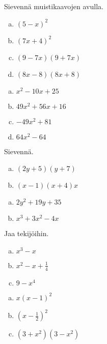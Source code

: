 \begin{tehtava}
    Sievennä muistikaavojen avulla.
    \begin{enumerate}[a)]
        \item $(5-x)^2$
        \item $(7x + 4)^2$
        \item $(9 - 7x)(9 + 7x)$
        \item $(8x - 8)(8x + 8)$
    \end{enumerate}
    \begin{vastaus}
        \begin{enumerate}[a)]
            \item $x^2 - 10x + 25$
            \item $49x^2 + 56x + 16$
            \item $-49x^2 + 81$
            \item $64x^2 - 64$
        \end{enumerate}
    \end{vastaus}
\end{tehtava}

\begin{tehtava}
    Sievennä.
    \begin{enumerate}[a)]
        \item $(2y+5)(y+7)$
        \item $(x-1)(x+4)x$
    \end{enumerate}
    \begin{vastaus}
        \begin{enumerate}[a)]
            \item $2y^2 + 19y + 35$
            \item $x^3 + 3x^2 - 4x$
        \end{enumerate}
    \end{vastaus}
\end{tehtava}

\begin{tehtava}
    Jaa tekijöihin.
    \begin{enumerate}[a)]
    	\item $x^3 - x$
        \item $x^2 - x + \frac{1}{4} $
        \item $9-x^4$
    \end{enumerate}
    \begin{vastaus}
        \begin{enumerate}[a)]
            \item $x(x-1)^2$
            \item $(x-\frac{1}{2})^2$
            \item $(3+x^2)(3-x^2)$
        \end{enumerate}
    \end{vastaus}
\end{tehtava}

